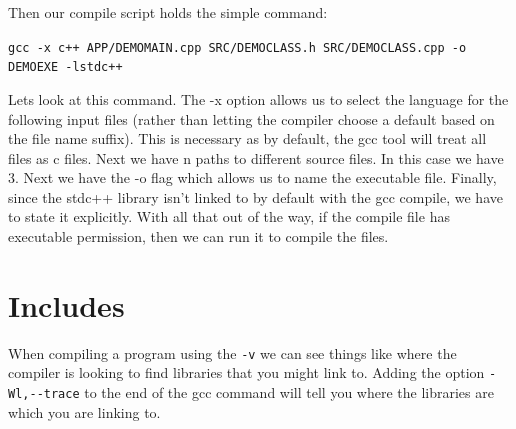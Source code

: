 \documentclass[12pt]{extarticle}
\theoremstyle{plain}
\theoremstyle{plain}
\theoremstyle{plain}
\theoremstyle{Definition}
\theoremstyle{Definition}
\theoremstyle{plain}
\theoremstyle{plain}
\begin{document}
	Then our compile script holds the simple command:
	\begin{center}
		\verb|gcc -x c++ APP/DEMOMAIN.cpp SRC/DEMOCLASS.h SRC/DEMOCLASS.cpp -o DEMOEXE -lstdc++|
	\end{center}
	Lets look at this command. The -x option allows us to select the language for the following input files
(rather than letting the compiler choose a default based on the
	file name suffix). This is necessary as by default, the gcc tool will treat all files as c files. Next we have n paths to different source files. In this case we have 3. Next we have the -o flag which allows us to name the executable file. Finally, since the stdc++ library isn't linked to by default with the gcc compile, we have to state it explicitly. 
	With all that out of the way, if the compile file has executable permission, then we can run it to compile the files. 

	\section{Includes}
		When compiling a program using the \verb|-v| we can see things like where the compiler is looking to find libraries that you might link to. Adding the option \verb|-Wl,--trace| to the end of the gcc command will tell you where the libraries are which you are linking to. 
\end{document}
